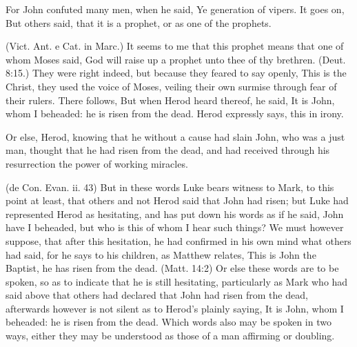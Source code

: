  For John confuted many men, when he said, Ye generation of vipers. It goes on, But others said, that it is a prophet, or as one of the prophets.

 (Vict. Ant. e Cat. in Marc.) It seems to me that this prophet means that one of whom Moses said, God will raise up a prophet unto thee of thy brethren. (Deut. 8:15.) They were right indeed, but because they feared to say openly, This is the Christ, they used the voice of Moses, veiling their own surmise through fear of their rulers. There follows, But when Herod heard thereof, he said, It is John, whom I beheaded: he is risen from the dead. Herod expressly says, this in irony.

 Or else, Herod, knowing that he without a cause had slain John, who was a just man, thought that he had risen from the dead, and had received through his resurrection the power of working miracles.

 (de Con. Evan. ii. 43) But in these words Luke bears witness to Mark, to this point at least, that others and not Herod said that John had risen; but Luke had represented Herod as hesitating, and has put down his words as if he said, John have I beheaded, but who is this of whom I hear such things? We must however suppose, that after this hesitation, he had confirmed in his own mind what others had said, for he says to his children, as Matthew relates, This is John the Baptist, he has risen from the dead. (Matt. 14:2) Or else these words are to be spoken, so as to indicate that he is still hesitating, particularly as Mark who had said above that others had declared that John had risen from the dead, afterwards however is not silent as to Herod’s plainly saying, It is John, whom I beheaded: he is risen from the dead. Which words also may be spoken in two ways, either they may be understood as those of a man affirming or doubling.

